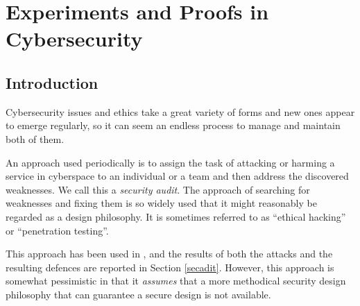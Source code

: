 
\chapter{Experiments and Proofs in Cybersecurity }\label{Ch4}
\section{Introduction}
\thispagestyle{empty}
\pagestyle{empty}
% 
% 
% 
% 


Cybersecurity issues and ethics take a great variety of forms and new ones appear to emerge regularly, so it can seem an endless process to manage and maintain both of them\cite{josang2005user}. 

An approach used periodically is to assign the task of attacking or harming a service in cyberspace to an individual or a team and then address the discovered weaknesses. We call this a {\em security audit}. The approach of searching for weaknesses and fixing them is so widely used that it might reasonably be regarded as a design philosophy. It is sometimes referred to as ``ethical hacking'' or ``penetration testing''.

This approach has been used in \cite{sheniar2018experiments}, and the results of both the attacks and the resulting defences are reported in Section \ref{secadit}. However, this approach is somewhat pessimistic in that it {\em assumes} that a more methodical security design philosophy that can guarantee a secure design is not available. 

